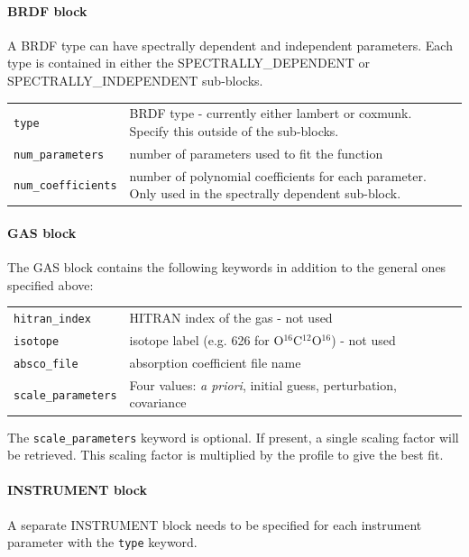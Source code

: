 \documentclass{article}
\begin{document}
\paragraph{BRDF block}

A BRDF type can have spectrally dependent and independent parameters.
Each type is contained in either the SPECTRALLY\_DEPENDENT or
SPECTRALLY\_INDEPENDENT sub-blocks.  

\begin{tabular}{|l|p{3.75in}|}
\hline
\texttt{type} & BRDF type - currently either lambert or coxmunk.
Specify this outside of the sub-blocks.\\
\texttt{num\_parameters}   & number of parameters used to fit the function\\
\texttt{num\_coefficients} & number of polynomial coefficients for
each parameter.  Only used in the spectrally dependent sub-block.\\
\hline
\end{tabular}


\paragraph{GAS block}
The GAS block contains the following keywords in addition to the general ones specified above:

\begin{tabular}{|l|p{3.75in}|}
\hline
\texttt{hitran\_index} & HITRAN index of the gas - not used\\
\texttt{isotope}       & isotope label (e.g. 626 for O$^{16}$C$^{12}$O$^{16}$) - not used\\
\texttt{absco\_file}   & absorption coefficient file name\\
\texttt{scale\_parameters} & Four values: \textit{a priori}, initial guess, perturbation, covariance\\
\hline
\end{tabular}

The \texttt{scale\_parameters} keyword is optional.  If present, a single scaling factor will be retrieved.  This scaling factor is multiplied by the profile to give the best fit.

\paragraph{INSTRUMENT block}

A separate INSTRUMENT block needs to be specified for each instrument parameter with the \texttt{type} keyword.
\end{document}
